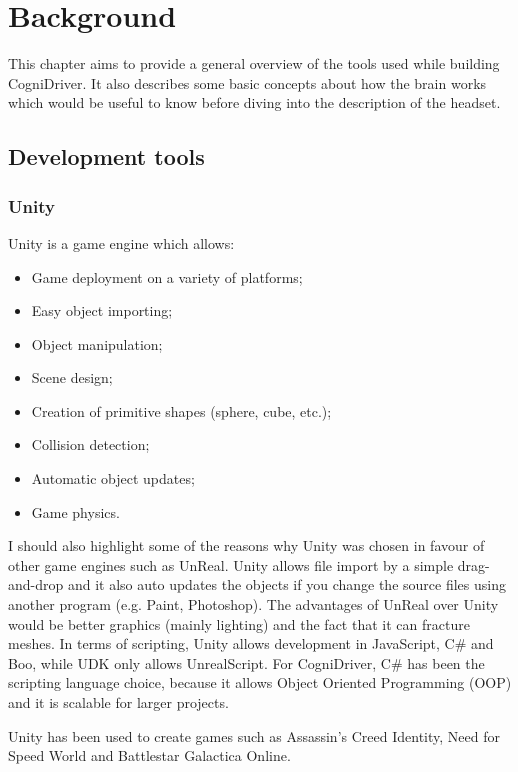 \chapter{Background}
\label{cha:background}

This chapter aims to provide a general overview of the tools used while building CogniDriver. It also describes some basic concepts about how the brain works which would be useful to know before diving into the description of the headset. 

\section{Development tools}

\subsection{Unity}
Unity is a game engine which allows:
\begin{multicols}{2}
\begin{itemize}
	\setlength\itemsep{-2mm}
	\item Game deployment on a variety of platforms;
	\item Easy object importing;
	\item Object manipulation;
	\item Scene design;
	\item Creation of primitive shapes (sphere, cube, etc.);
	\item Collision detection;
	\item Automatic object updates;
	\item Game physics.
\end{itemize} 
\end{multicols}

I should also highlight some of the reasons why Unity was chosen in favour of other game engines such as UnReal. Unity allows file import by a simple drag-and-drop and it also auto updates the objects if you change the source files using another program (e.g. Paint, Photoshop). The advantages of UnReal over Unity would be better graphics (mainly lighting) and the fact that it can fracture meshes. In terms of scripting, Unity allows development in JavaScript, C\# and Boo, while UDK only allows UnrealScript. For CogniDriver, C\# has been the scripting language choice, because it allows Object Oriented Programming (OOP) and it is scalable for larger projects. 

Unity has been used to create games such as Assassin's Creed Identity, Need for Speed World and Battlestar Galactica Online.

